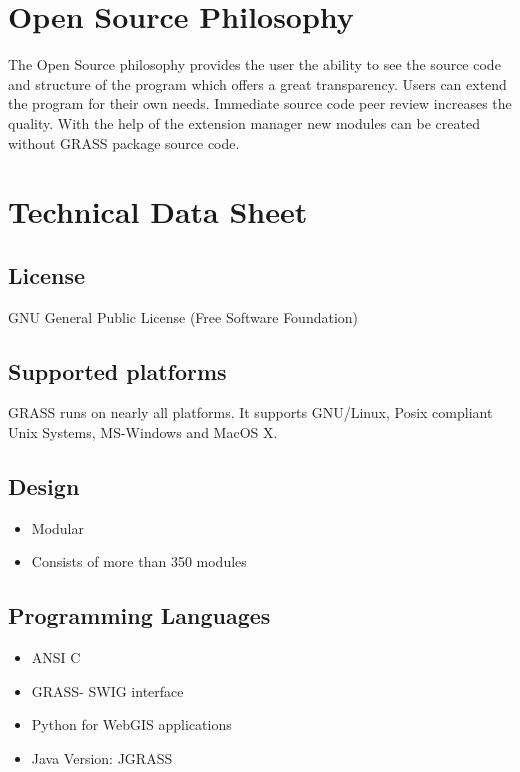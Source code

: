 \documentclass[notumble,a4paper,10pt,nofoldmark]{leaflet}
\begin{document}
\section{Open Source Philosophy}

The Open Source philosophy provides the user the ability to see the source code and structure of the program which offers a great transparency. Users can extend the program for their own needs. Immediate source code peer review increases the quality. With the help of the extension manager new modules can be created without GRASS package source code.

\section{Technical Data Sheet}

\subsection{License}

GNU General Public License (Free Software Foundation)

\subsection{Supported platforms}

GRASS runs on nearly all platforms. It supports GNU/Linux, Posix compliant Unix Systems, MS-Windows and MacOS X.

\subsection{Design}

\begin{itemize}
\item Modular
\item Consists of more than 350 modules
\end{itemize}

\subsection{Programming Languages}

\begin{itemize}
\item ANSI C
\item GRASS- SWIG interface
\item Python for WebGIS applications
\item Java Version: JGRASS
\end{itemize}
\end{document}
